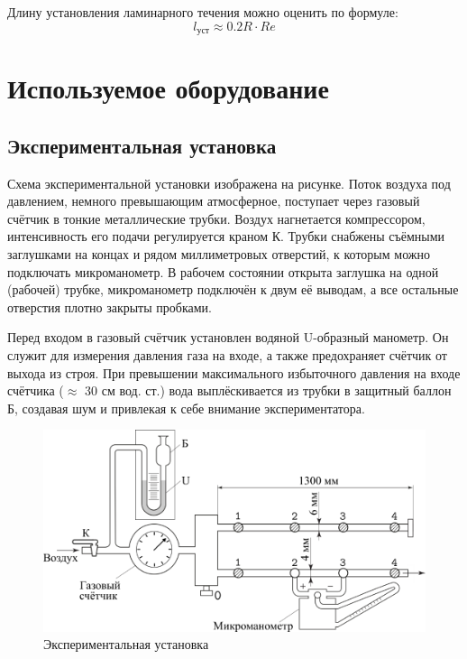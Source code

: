 \documentclass[a4paper,12pt]{article} %
\begin{document}
Длину установления ламинарного течения можно оценить по формуле:
\begin{equation}\label{длина}
l_{\text{уст}} \approx 0.2R\cdot Re
\end{equation}

\newpage

\section{Используемое оборудование}

\subsection*{Экспериментальная установка}

Схема экспериментальной установки изображена на рисунке. Поток воздуха
под давлением, немного превышающим атмосферное, поступает через газовый счётчик в тонкие металлические трубки. Воздух нагнетается компрессором, интенсивность его подачи регулируется краном К. Трубки снабжены
съёмными заглушками на концах и рядом миллиметровых отверстий, к которым можно подключать микроманометр. В рабочем состоянии открыта заглушка на одной (рабочей) трубке, микроманометр подключён к двум её выводам, а все остальные отверстия плотно закрыты пробками.

Перед входом в газовый счётчик установлен водяной U-образный манометр. Он служит для измерения давления газа на входе, а также предохраняет
счётчик от выхода из строя. При превышении максимального избыточного
давления на входе счётчика ($\approx$ 30 см вод. ст.) вода выплёскивается из трубки
в защитный баллон Б, создавая шум и привлекая к себе внимание экспериментатора.

\begin{figure}[h!]
    \centering
    \includegraphics[width=\textwidth]{установка.png}
    \caption{Экспериментальная установка}
\end{figure}
\end{document}
